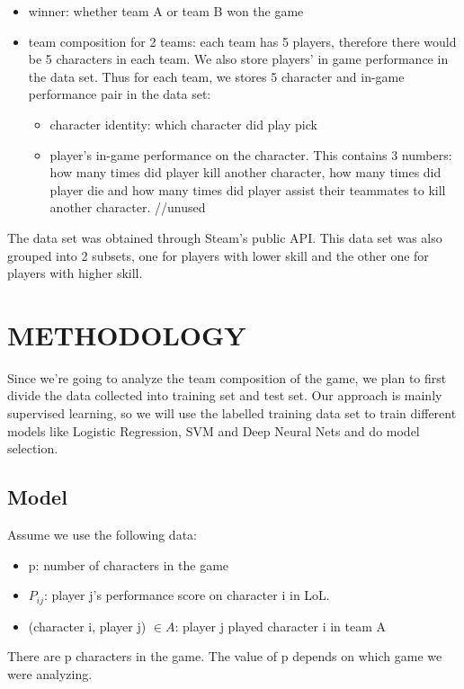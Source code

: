 \documentclass[conference]{IEEEtran}
\begin{document}
\begin{itemize}
\item winner: whether team A or team B won the game
\item team composition for 2 teams: each team has 5 players, therefore there would be 5 characters in each team. We also store players' in game performance in the data set. Thus for each team, we stores 5 character and in-game performance pair in the data set:
	\begin{itemize}
	\item character identity: which character did play pick
	\item player's in-game performance on the character. This contains 3 numbers: how many times did player kill another character, how many times did player die and how many times did player assist their teammates to kill another character. //unused
	\end{itemize}
\end{itemize}
The data set was obtained through Steam's public API. This data set was also grouped into 2 subsets, one for players with lower skill and the other one for players with higher skill.

\section{METHODOLOGY}
Since we're going to analyze the team composition of the game, we plan to first divide the data collected into training set and test set. Our approach is mainly supervised learning, so we will use the labelled training data set to train different models like Logistic Regression, SVM and Deep Neural Nets and do model selection. 

\subsection{Model}


Assume we use the following data:
\begin{itemize}
\item p: number of characters in the game
\item $P_{ij}$: player j's performance score on character i in LoL.
\item (character i, player j) $\in A$: player j played character i in team A

\end{itemize}
There are p characters in the game. The value of p depends on which game we were analyzing. 
\end{document}
